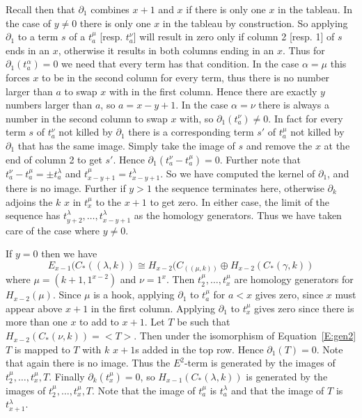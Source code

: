 \documentclass{elsart}
\begin{document}
\begin{pf}
  Recall then that $\partial_1$ combines $x+1$ and $x$ if there is only one $x$ in the tableau. In the case of $y \ne 0$ there is only one 
  $x$ in the tableau by construction. So applying $\partial_1$ to a term $s$ of a $t^\mu_a$ [resp. $t^\nu_a$] will result in zero only if 
  column 2 [resp. 1] of $s$ ends in an $x$, otherwise it results in both columns ending in an $x$. Thus for $\partial_1(t^\alpha_a)=0$ we
  need that every term has that condition. In the case $\alpha=\mu$ this forces $x$ to be in the second column for every term, thus there is
  no number larger than $a$ to swap $x$ with in the first column. Hence there are exactly $y$ numbers larger than $a$, so $a=x-y+1$.
  In the case $\alpha=\nu$ there is always a number in the second column to swap $x$ with, so $\partial_1(t^\nu_a) \ne 0$.
  In fact for every term $s$ of $t^\nu_a$ not killed by $\partial_1$ there is a corresponding term $s'$ of $t^\mu_a$ not killed by 
  $\partial_1$ that
  has the same image. Simply take the image of $s$ and remove the $x$ at the end of column 2 to get $s'$. Hence 
  $\partial_1(t^\nu_a - t^\mu_a) = 0$.  Further note that $t^\nu_a-t^\mu_a = \pm t^\lambda_a$ and $t^\mu_{x-y+1} = t^\lambda_{x-y+1}$.
  So we have computed the kernel of $\partial_1$, and there is no image. Further if $ y> 1$ the sequence terminates here, otherwise 
  $\partial_k$ adjoins the $k$ $x$ in $t^\mu_x$ to the $x+1$ to get zero. In either case, the limit of the sequence has $t^\lambda_{y+2}, 
  \ldots, t^\lambda_{x-y+1}$ as the homology generators.
  Thus we have taken care of the case where $y \ne 0$.

  If $y=0$ then we have 
  \begin{equation} \label{E:gen2} 
    E_{x-1}(C_*((\lambda,k)) \cong H_{x-2}(C_((\mu,k)) \oplus H_{x-2}(C_*(\gamma,k))
  \end{equation}
  where $\mu = (k+1, 1^{x-2})$ and $\nu = 1^x$. Then $t^\mu_2, \ldots, t^\mu_x$ are homology generators for $H_{x-2}(\mu)$. Since 
  $\mu$ is a hook, applying
  $\partial_1$ to $t^\mu_a$ for $a<x$ gives zero, since $x$ must appear above $x+1$ in the first column. Applying $\partial_1$ to 
  $t^\mu_x$ gives zero since there is more than one $x$ to add to $x+1$. Let $T$ be such that  $H_{x-2}(C_*(\nu,k)) = <T>$. Then under the 
  isomorphism of Equation~\ref{E:gen2} $T$ is mapped to $T$ with $k$ $x+1$s added in the top row. Hence $\partial_1(T) = 0$. Note that 
  again there is no image. Thus the $E^2$-term is generated by the images of $t^\mu_2, \ldots, t^\mu_x, T$. Finally $\partial_k(t^\mu_x)
  = 0$, so $H_{x-1}(C_*(\lambda,k))$ is generated by the images of $t^\mu_2, \ldots, t^\mu_x, T$. Note that the image of $t^\mu_a$ is $t^\lambda_a$
  and that the image of $T$ is $t^\lambda_{x+1}$. 


\end{pf}
\end{document}

